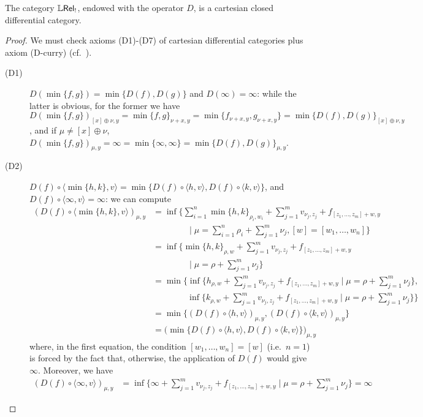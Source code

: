 \begin{proposition}
The category $\mathbb{L} \mathsf{Rel}_!$, endowed with the operator $D$, is a cartesian closed differential category.
\end{proposition}
\begin{proof}
We must check axioms (D1)-(D7) of cartesian differential categories  plus axiom (D-curry) (cf.~\cite{Manzo2012}).
\begin{description}
\item[(D1)]$D(\min\{f,g\})=\min \{D(f),D(g)\}$ and $D(\infty)=\infty$: 
while the latter is obvious, for the former we have 
$D(\min\{f,g\})_{[x]\oplus\nu,y}= \min\{f,g\}_{\nu+x,y}= \min\{f_{\nu+x,y},g_{\nu+x,y}\}=\min\{D(f),D(g)\}_{[x]\oplus \nu,y}$, and if $\mu\neq [x]\oplus \nu$, 
$D(\min\{f,g\})_{\mu,y}= \infty= \min\{\infty, \infty\}=\min\{ D(f),D(g)\}_{\mu,y}$. 
\item[(D2)]
$D(f)\circ \langle \min\{h,k\},v\rangle= \min\{ D(f)\circ \langle h,v\rangle, D(f)\circ \langle k,v\rangle\}$, and $D(f)\circ \langle \infty,v\rangle=\infty$: we can compute
	\begin{align*}
	(D(f)\circ \langle \min\{h,k\},v\rangle)_{\mu,y}&=
	\inf\Big\{ 
	\sum_{i=1}^{n}\min\{h,k\}_{\rho_{i},w_{i}}+
	\sum_{j=1}^{m}v_{\nu_{j},z_{j}}
	+
	f_{[z_{1},\dots, z_{m}]+w,y}\\
&	\qquad\qquad\mid
	\mu=\sum_{i=1}^{n}\rho_{i}+\sum_{j=1}^{m}\nu_{j},	[w]=[w_{1},\dots, w_{n}]
	\Big\}\\
	& 
=	\inf\Big\{ 
	\min\{h,k\}_{\rho,w}+
	\sum_{j=1}^{m}v_{\nu_{j},z_{j}}
	+
	f_{[z_{1},\dots, z_{m}]+w,y}\\
&	\qquad\qquad\mid
	\mu=\rho+\sum_{j=1}^{m}\nu_{j}
	\Big\}\\
	&=	\min\Big\{\inf\big\{ 
	h_{\rho,w}+
	\sum_{j=1}^{m}v_{\nu_{j},z_{j}}
	+
	f_{[z_{1},\dots, z_{m}]+w,y}	\mid
	\mu=\rho+\sum_{j=1}^{m}\nu_{j}\big\}, \\
	& \qquad\qquad \inf\big\{ 
	k_{\rho,w}+
	\sum_{j=1}^{m}v_{\nu_{j},z_{j}}
	+
	f_{[z_{1},\dots, z_{m}]+w,y}	\mid
	\mu=\rho+\sum_{j=1}^{m}\nu_{j}\big\}\Big\}\\
	& = \min\Big\{(D(f)\circ \langle h,v\rangle)_{\mu,y}, (D(f)\circ \langle k,v\rangle)_{\mu,y}\Big\}\\
		& = \Big(\min\big\{D(f)\circ \langle h,v\rangle, D(f)\circ \langle k,v\rangle\big\}\Big )_{\mu,y}
	\end{align*}
	where, in the first equation, the condition $[w_{1},\dots, w_{n}]=[w]$ (i.e.~$n=1$) is forced by the fact that, otherwise, the application of $D(f)$ would give $\infty$. Moreover, we have
\begin{align*}
(D(f) \circ \langle \infty, v\rangle)_{\mu,y}&=\inf\Big\{ 
	\infty+
	\sum_{j=1}^{m}v_{\nu_{j},z_{j}}
	+
	f_{[z_{1},\dots, z_{m}]+w,y}\mid
	\mu=\rho+\sum_{j=1}^{m}\nu_{j}
	\Big\} = \infty
\end{align*}


\end{description}
\end{proof}
